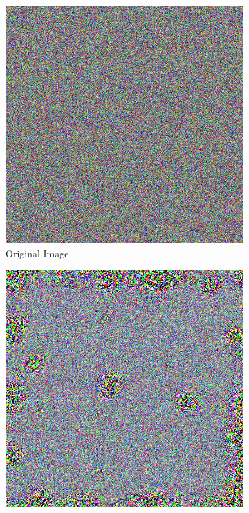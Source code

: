 \begin{figure}
    \captionsetup{justification=centering}

    \begin{subfigure}[t]{0.28\textwidth}
        \captionsetup{justification=centering}
        \centering
        \includegraphics[width=.7\linewidth]{figuras/random_image.png}
        \caption{Original Image}
    \end{subfigure}
    \hfill
    \begin{subfigure}[t]{0.28\textwidth}
        \captionsetup{justification=centering}
        \centering
        \includegraphics[width=.7\linewidth]{figuras/random_image_dream.png}

\end{subfigure}
\end{figure}
